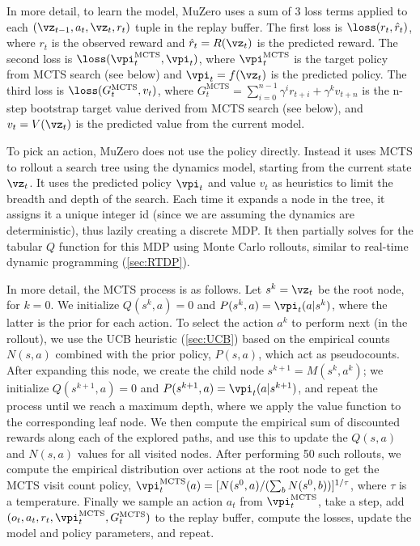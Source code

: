 \newcommand{\mcts}{\text{MCTS}}

In more detail,
to learn the model, MuZero uses a sum of 3 loss terms
applied to each $(\vz_{t-1}, a_{t}, \vz_{t}, r_{t})$
tuple in the replay buffer.
The first loss is
$\loss(r_t, \hat{r}_t)$, where $r_t$ is the observed reward
and $\hat{r}_t=R(\vz_{t})$ is the predicted reward.
The second loss is
$\loss(\vpi^{\mcts}_t, \vpi_t)$, where $\vpi^{\mcts}_t$ is the target policy
from MCTS search (see below)
and $\vpi_t = f(\vz_t)$ is the predicted policy.
The third loss is
$\loss(G_t^{\mcts}, v_t)$,
where  $G^{\mcts}_t = \sum_{i=0}^{n-1} \gamma^i r_{t+i} + \gamma^k v_{t+n}$
is the n-step bootstrap
target value derived from MCTS search (see below),
and $v_t=V(\vz_t)$ is the predicted value from the current model.


To pick an action, MuZero does not use the policy directly.
Instead it uses MCTS to rollout a search tree
using the dynamics model, starting from the current state $\vz_t$.
It uses the predicted policy  $\vpi_t$ and value $v_t$
as heuristics to limit the breadth and depth of the search.
Each time it expands a node in the tree, it assigns it a unique
integer id (since we are assuming the dynamics are deterministic),
thus lazily creating a discrete MDP.
It then partially solves for the tabular $Q$ function for this MDP
using Monte Carlo rollouts,
similar to real-time dynamic programming (\cref{sec:RTDP}).

In more detail, the MCTS process is as follows.
Let $s^k=\vz_t$ be the root node, for $k=0$.
We initialize $Q(s^k,a)=0$ and $P(s^k,a)=\vpi_t(a|s^k)$,
where the latter is the prior for each action.
To select the action $a^k$ to perform next (in the rollout),
we  use the UCB heuristic  (\cref{sec:UCB})
based on the empirical counts $N(s,a)$
combined with  the prior policy, $P(s,a)$,
which act as pseudocounts.
After expanding this node, we  create the child node
$s^{k+1}=M(s^k,a^k)$;
we initialize $Q(s^{k+1},a)=0$ and $P(s^{k+1},a)=\vpi_t(a|s^{k+1})$,
and repeat the process until we reach a maximum depth,
where
we apply the value function to the corresponding leaf node.
We then compute the empirical sum of discounted rewards along each of the
explored paths, and use this to update the $Q(s,a)$ and $N(s,a)$
values for all visited nodes.
After performing 50 such rollouts, we compute the empirical
distribution
over actions at the root node to get the MCTS visit count policy,
$\vpi^{\mcts}_t(a) = [N(s^0,a)/(\sum_b N(s^0,b))]^{1/\tau}$,
where $\tau$ is a temperature.
Finally we sample an action $a_{t}$ from $\vpi^{\mcts}_t$,
take a step,
add $(o_t, a_t, r_t, \vpi_t^{\mcts}, G_t^{\mcts})$ to the replay buffer,
compute the losses, update the model and policy parameters, and repeat.


